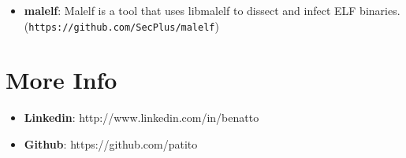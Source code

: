 \documentclass[margin]{res}
\begin{document}
\begin{resume}
\begin{itemize}
		    \item \textbf{malelf}: Malelf is a tool that uses libmalelf to dissect and infect ELF binaries. 
		                           (\texttt{https://github.com/SecPlus/malelf})
		\end{itemize}
 
\section{More Info}
    \begin{itemize}
        \item \textbf{Linkedin}: http://www.linkedin.com/in/benatto
         \item \textbf{Github}: https://github.com/patito
    \end{itemize}


\end{resume} 
\end{document}
